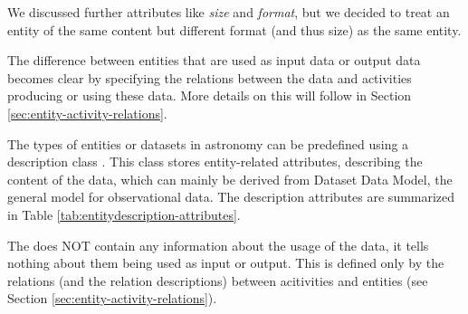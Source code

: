 We discussed further attributes like \emph{size} and \emph{format}, but we decided to treat an
entity of the same content but different format (and thus size) as the same entity.


The difference between entities that are used as input data or output data 
becomes clear by specifying the relations between the data and activities producing or using these data.
More details on this will follow in Section \ref{sec:entity-activity-relations}.

The types of entities or datasets in astronomy can be predefined using a description
class . %
This class stores entity-related 
attributes, describing the content of the data, which can mainly be derived from 
Dataset Data Model, the general model for observational data.
The description attributes are summarized in Table 
\ref{tab:entitydescription-attributes}.

The  does NOT contain any information about the usage 
of the data, it tells nothing about them being used as input or output. This is 
defined only by the relations (and the relation descriptions) between acitivities
and entities (see Section \ref{sec:entity-activity-relations}).


